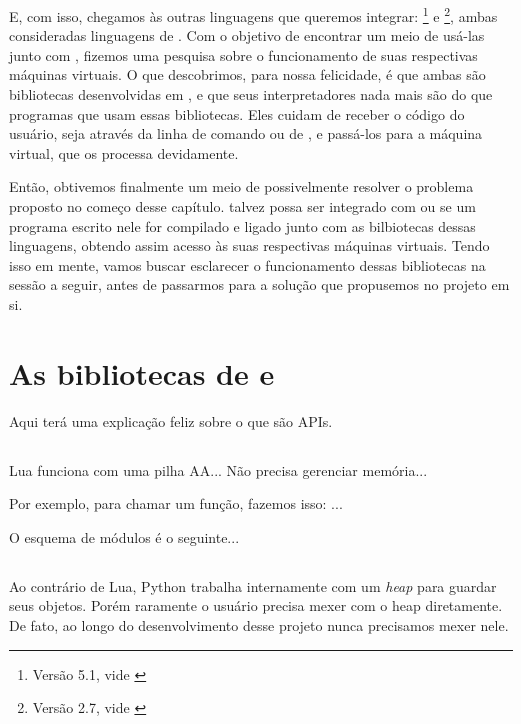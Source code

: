     E, com isso, chegamos às outras linguagens que queremos integrar:
    \footnote{Versão 5.1, vide \cite{lua:00}} e
    \footnote{Versão 2.7, vide \cite{python:00}}, ambas
    consideradas linguagens de \script{}. Com o objetivo de encontrar um meio de
    usá-las junto com \CXX{}, fizemos uma pesquisa sobre o funcionamento de suas
    respectivas máquinas virtuais. O que descobrimos, para nossa felicidade, é
    que ambas são bibliotecas desenvolvidas em \C{}, e que seus interpretadores
    nada mais são do que programas que usam essas bibliotecas. Eles cuidam de
    receber o código do usuário, seja através da linha de comando ou de
    , e passá-los para a máquina virtual, que os processa devidamente.
    
    Então, obtivemos finalmente um meio de possivelmente resolver o problema
    proposto no começo desse capítulo. \CXX{} talvez possa ser integrado com
     ou  se um programa escrito nele for compilado e
    ligado junto com as bilbiotecas dessas linguagens, obtendo assim acesso às
    suas respectivas máquinas virtuais. Tendo isso em mente, vamos buscar
    esclarecer o funcionamento dessas bibliotecas na sessão a seguir, antes de
    passarmos para a solução que propusemos no projeto em si.

  \section{As bibliotecas de  e }
  \label{cap:conceitos:apis}

    Aqui terá uma explicação feliz sobre o que são APIs.

    \subsection{}

      Lua funciona com uma pilha AA...
      Não precisa gerenciar memória...

      Por exemplo, para chamar um função, fazemos isso: ...

      O esquema de módulos é o seguinte...

    \subsection{}
    Ao contrário de Lua, Python trabalha internamente com um \emph{heap} para guardar seus objetos.
    Porém raramente o usuário precisa mexer com o heap diretamente. De fato, ao longo do desenvolvimento
    desse projeto nunca precisamos mexer nele.
    
